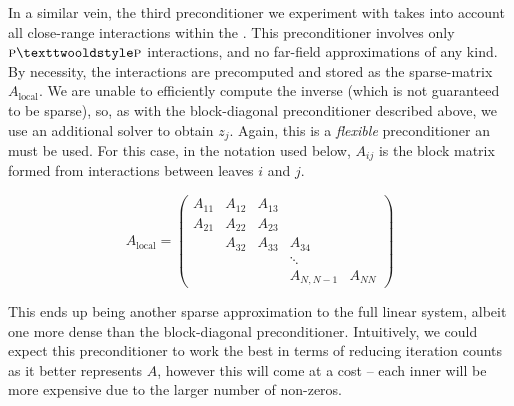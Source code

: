 In a similar vein, the third preconditioner we experiment with takes into account all close-range interactions within the {\fmm} \cite{Chailletetal2011}. This preconditioner involves only $\ptop$ interactions, and no far-field approximations of any kind. By necessity, the interactions are precomputed and stored as the sparse-matrix $A_{\text{local}}$. We are unable to efficiently compute the inverse (which is not guaranteed to be sparse), so, as with the block-diagonal preconditioner described above, we use an additional {\gmres} solver to obtain $z_j$. Again, this is a \emph{flexible} preconditioner an {\fgmres} must be used. For this case, in the notation used below, $A_{ij}$ is the block matrix formed from interactions between leaves $i$ and $j$.

\begin{equation} A_{\text{local}} = 
\left(\begin{array}{ccccc}
	A_{11} & A_{12}  & A_{13}  &   &   \\
	A_{21}  & A_{22} & A_{23}  &   &   \\
	  & A_{32} & A_{33} & A_{34}  &   \\
	  &   &   & \ddots &  \\
	  &   &   &  A_{N,N-1} & A_{NN}
\end{array}\right)
\end{equation}

This ends up being another sparse approximation to the full linear system, albeit one more dense than the block-diagonal preconditioner. Intuitively, we could expect this preconditioner to work the best in terms of reducing iteration counts as it better represents $A$, however this will come at a cost -- each inner {\gmres} will be more expensive due to the larger number of non-zeros.
